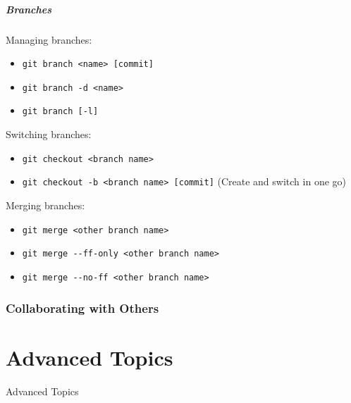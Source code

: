 \documentclass{beamer}
\begin{document}
\begin{frame}
 \frametitle{Branches}

 Managing branches:
 \begin{itemize}
  \item \texttt{git branch <name> [commit]}
  \item \texttt{git branch -d <name>}
  \item \texttt{git branch [-l]}
 \end{itemize}

 \pause
 Switching branches:
 \begin{itemize}
  \item \texttt{git checkout <branch name>}
  \item \texttt{git checkout -b <branch name> [commit]} (Create and switch in one go)
 \end{itemize}

 \pause
 Merging branches:
 \begin{itemize}
  \item \texttt{git merge <other branch name>}
  \item \texttt{git merge \alert{-{}-ff-only} <other branch name>}
  \item \texttt{git merge \alert{-{}-no-ff} <other branch name>}
 \end{itemize}
\end{frame}

\section{Collaborating with Others}

\part{Advanced Topics}

\begin{frame}[plain]
 \vfill
 \begin{center}
  \LARGE \color{solarizedAccent} Advanced Topics
 \end{center}
 \vfill
\end{frame}
\end{document}
